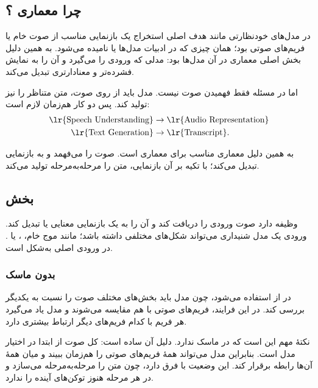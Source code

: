 \subsection{چرا معماری ؟}
در مدل‌های خودنظارتی مانند  هدف اصلی استخراج یک بازنمایی مناسب از صوت خام یا فریم‌های صوتی بود؛ همان چیزی که در ادبیات مدل‌ها  یا  نامیده می‌شود. به همین دلیل بخش اصلی معماری در آن مدل‌ها  بود: مدلی که ورودی را می‌گیرد و آن را به نمایش فشرده‌تر و معنادارتری تبدیل می‌کند.

اما در  مسئله فقط فهمیدن صوت نیست. مدل باید از روی صوت، متن متناظر را نیز تولید کند. پس دو کار هم‌زمان لازم است:
\[
\begin{aligned}
\text{\lr{Speech Understanding}} &\rightarrow \text{\lr{Audio Representation}}\\
\text{\lr{Text Generation}} &\rightarrow \text{\lr{Transcript}}.
\end{aligned}
\]

به همین دلیل معماری مناسب برای  معماری  است.  صوت را می‌فهمد و به بازنمایی تبدیل می‌کند؛  با تکیه بر آن بازنمایی، متن را مرحله‌به‌مرحله تولید می‌کند.

\subsection{بخش }
 وظیفه دارد صوت ورودی را دریافت کند و آن را به یک بازنمایی معنایی یا  تبدیل کند. ورودی یک مدل شنیداری می‌تواند شکل‌های مختلفی داشته باشد؛ مانند موج خام، ،  یا . در  ورودی اصلی به‌شکل  است.

\subsubsection{ بدون ماسک}
در  از  استفاده می‌شود، چون مدل باید بخش‌های مختلف صوت را نسبت به یکدیگر بررسی کند. در این فرایند، فریم‌های صوتی با هم مقایسه می‌شوند و مدل یاد می‌گیرد هر فریم با کدام فریم‌های دیگر ارتباط بیشتری دارد.

نکتهٔ مهم این است که  در  ماسک ندارد. دلیل آن ساده است: کل صوت از ابتدا در اختیار مدل است. بنابراین مدل می‌تواند همهٔ فریم‌های صوتی را هم‌زمان ببیند و میان همهٔ آن‌ها رابطه برقرار کند. این وضعیت با  فرق دارد، چون  متن را مرحله‌به‌مرحله می‌سازد و در هر مرحله هنوز توکن‌های آینده را ندارد.

